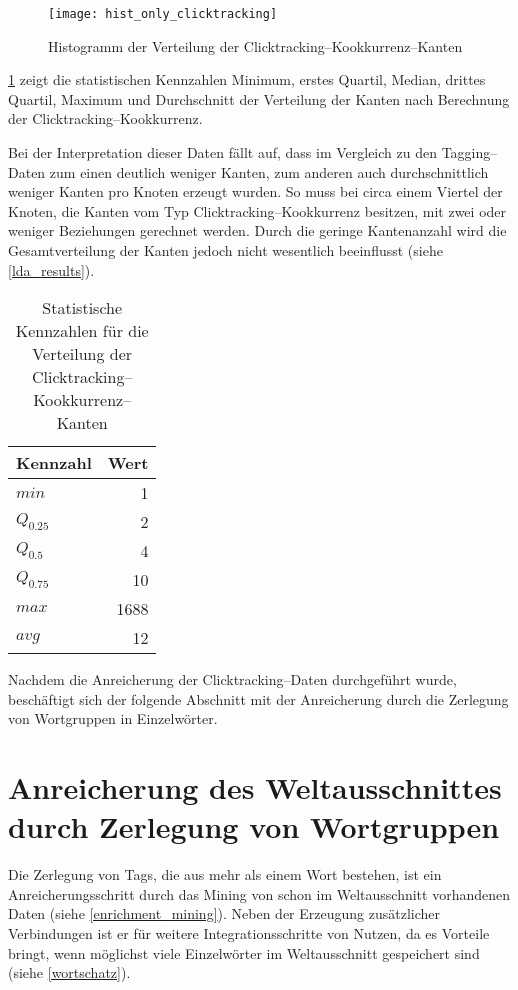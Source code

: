 \begin{figure}[t]
\centering
\texttt{[image: hist\_only\_clicktracking]}
\caption{Histogramm der Verteilung der Clicktracking--Kookkurrenz--Kanten}
\label{fig:hist_only_clicktracking}
\end{figure}

\cref{tab:only_clicktracking} zeigt die statistischen Kennzahlen Minimum, erstes Quartil, Median, drittes Quartil, Maximum und Durchschnitt der Verteilung der Kanten nach Berechnung der Clicktracking--Kookkurrenz.

Bei der Interpretation dieser Daten fällt auf, dass im Vergleich zu den Tagging--Daten zum einen deutlich weniger Kanten, zum anderen auch durchschnittlich weniger Kanten pro Knoten erzeugt wurden. So muss bei circa einem Viertel der Knoten, die Kanten vom Typ Clicktracking--Kookkurrenz besitzen, mit zwei oder weniger Beziehungen gerechnet werden. Durch die geringe Kantenanzahl wird die Gesamtverteilung der Kanten jedoch nicht wesentlich beeinflusst (siehe \cref{lda_results}).

\begin{table}[h]
\centering
\begin{tabular}{lr}
    \toprule
    Kennzahl & Wert \\
    \midrule
    \(min\) & \num{1} \\
    \(Q_{0.25}\) & \num{2} \\
    \(Q_{0.5}\) & \num{4} \\
    \(Q_{0.75}\) & \num{10} \\
    \(max\) &  \num{1688} \\
    \(avg\) &  \num{12} \\
    \bottomrule
\end{tabular}
\caption{Statistische Kennzahlen für die Verteilung der Clicktracking--Kookkurrenz--Kanten}
\label{tab:only_clicktracking}
\end{table}

Nachdem die Anreicherung der Clicktracking--Daten durchgeführt wurde, beschäftigt sich der folgende Abschnitt mit der Anreicherung durch die Zerlegung von Wortgruppen in Einzelwörter.

\section{Anreicherung des Weltausschnittes durch Zerlegung von Wortgruppen}
\label{decomposition}

Die Zerlegung von Tags, die aus mehr als einem Wort bestehen, ist ein Anreicherungsschritt durch das Mining von schon im Weltausschnitt vorhandenen Daten (siehe \cref{enrichment_mining}). Neben der Erzeugung zusätzlicher Verbindungen ist er für weitere Integrationsschritte von Nutzen, da es Vorteile bringt, wenn möglichst viele Einzelwörter im Weltausschnitt gespeichert sind (siehe \cref{wortschatz}).

